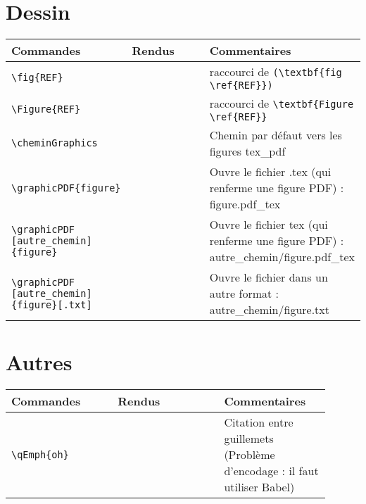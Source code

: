\documentclass[a4paper,12pt]{article}
\begin{document}
	
	\section{Dessin\label{REF}}

        \noindent
		\begin{tabular}{|p{0.3\linewidth}|p{0.3\linewidth}|p{0.4\linewidth}|}
			\hline
				\textbf{Commandes}&\textbf{Rendus}&\textbf{Commentaires}
			\\\hline\hline
				\verb!\fig{REF}!	&\fig{REF} 	&	raccourci de \verb!(\textbf{fig \ref{REF}})!
			\\\hline
				\verb!\Figure{REF}!	&\Figure{REF} 	&	raccourci de \verb!\textbf{Figure \ref{REF}}!
			\\\hline
				\verb!\cheminGraphics!	& \cheminGraphics	&	Chemin par défaut vers les figures tex\_pdf
			\\\hline
				\verb!\graphicPDF{figure}!	& 	&	Ouvre le fichier .tex (qui renferme une figure PDF) : \cheminGraphics figure.pdf\_tex
			\\\hline
				\verb!\graphicPDF! \verb![autre_chemin]! \verb!{figure}!	& 	&	Ouvre le fichier tex (qui renferme une figure PDF) : autre\_chemin/figure.pdf\_tex
			\\\hline
				\verb!\graphicPDF! \verb![autre_chemin]! \verb!{figure}[.txt]!	& 	&	Ouvre le fichier dans un autre format : autre\_chemin/figure.txt
			\\\hline
		\end{tabular}
	

	\section{Autres}

		\noindent
		\begin{tabular}{|p{0.3\linewidth}|p{0.3\linewidth}|p{0.3\linewidth}|}
			\hline
				\textbf{Commandes}&\textbf{Rendus}&\textbf{Commentaires}
			\\\hline\hline
				\verb!\qEmph{oh}!	&	\qEmph{oh} 	&	Citation entre guillemets (Problème d'encodage : il faut utiliser Babel)
			\\\hline
		\end{tabular}
\end{document}
